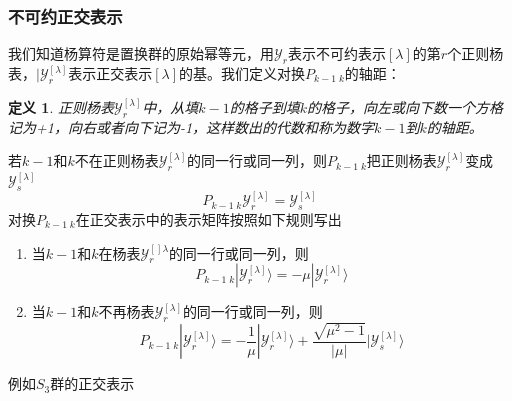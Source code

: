 \documentclass[12pt]{article}
\newtheorem{definition}{定义}[subsection]
\begin{document}
\subsubsection{不可约正交表示}
我们知道杨算符是置换群的原始幂等元，用$\mathcal{Y}_r$表示不可约表示$[\lambda]$的第$r$个正则杨表，$|\mathcal{Y}_r^{[\lambda]}$表示正交表示$[\lambda]$的基。我们定义对换$P_{k-1\;k}$的轴距：
\begin{definition}
    正则杨表$\mathcal{Y}_r^{[\lambda]}$中，从填$k-1$的格子到填$k$的格子，向左或向下数一个方格记为+1，向右或者向下记为-1，这样数出的代数和称为数字$k-1$到$k$的轴距。
\end{definition}
若$k-1$和$k$不在正则杨表$\mathcal{Y}_r^{[\lambda]}$的同一行或同一列，则$P_{k-1\;k}$把正则杨表$\mathcal{Y}_r^{[\lambda]}$变成$\mathcal{Y}_s^{[\lambda]}$
\begin{equation*}
    P_{k-1\;k}\mathcal{Y}_r^{[\lambda]}=\mathcal{Y}_s^{[\lambda]}
\end{equation*}
对换$P_{k-1\;k}$在正交表示中的表示矩阵按照如下规则写出
\begin{enumerate}
    \item 当$k-1$和$k$在杨表$\mathcal{Y}_r^{[]\lambda}$的同一行或同一列，则
    \begin{equation*}
        P_{k-1\;k}|\mathcal{Y}_r^{[\lambda]}\rangle=-\mu|\mathcal{Y}_r^{[\lambda]}\rangle
    \end{equation*}
    \item 当$k-1$和$k$不再杨表$\mathcal{Y}_r^{[\lambda]}$的同一行或同一列，则
    \begin{equation*}
        P_{k-1\;k}|\mathcal{Y}_r^{[\lambda]}\rangle=-\frac{1}{\mu}|\mathcal{Y}_r^{[\lambda]}\rangle+\frac{\sqrt{\mu^2-1}}{|\mu|}|\mathcal{Y}_s^{[\lambda]}\rangle
    \end{equation*}
\end{enumerate}
例如$S_3$群的正交表示
\end{document}

